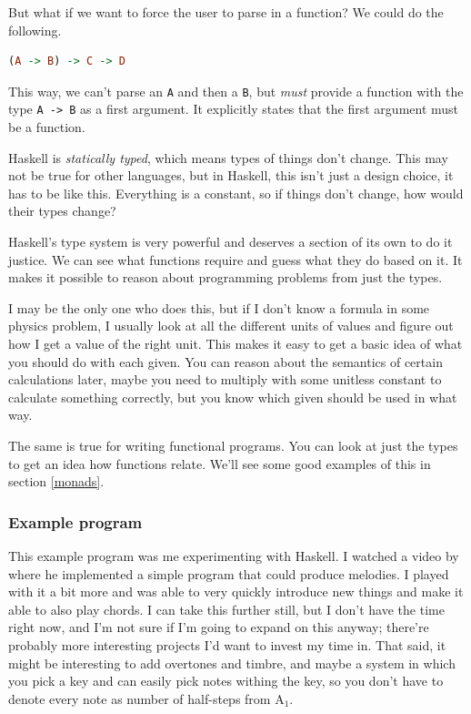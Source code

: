 \documentclass[11pt]{article}
\begin{document}
But what if we want to force the user to parse in a function? We could do the following.
\begin{lstlisting}[language=Haskell]
(A -> B) -> C -> D
\end{lstlisting}
This way, we can't parse an \texttt{A} and then a \texttt{B}, but \emph{must}
provide a function with the type \texttt{A -> B} as a first argument. It
explicitly states that the first argument must be a function.

Haskell is \emph{statically typed}, which means types of things don't change.
This may not be true for other languages, but in Haskell, this isn't just a
design choice, it has to be like this. Everything is a constant, so if things
don't change, how would their types change?

Haskell's type system is very powerful and deserves a section of its own to do
it justice. We can see what functions require and guess what they do based on
it. It makes it possible to reason about programming problems from just the
types.

I may be the only one who does this, but if I don't know a formula in some
physics problem, I usually look at all the different units of values and figure
out how I get a value of the right unit. This makes it easy to get a basic idea
of what you should do with each given. You can reason about the semantics of
certain calculations later, maybe you need to multiply with some unitless
constant to calculate something correctly, but you know which given should be
used in what way.

The same is true for writing functional programs. You can look at just the
types to get an idea how functions relate. We'll see some good examples of this
in section \ref{monads}.

\subsubsection{Example program}

This example program was me experimenting with Haskell. I watched a video by
\textcite{tsmusic} where he implemented a simple program that could produce
melodies. I played with it a bit more and was able to very quickly introduce
new things and make it able to also play chords. I can take this further still,
but I don't have the time right now, and I'm not sure if I'm going to expand on
this anyway; there're probably more interesting projects I'd want to invest my
time in. That said, it might be interesting to add overtones and timbre, and
maybe a system in which you pick a key and can easily pick notes withing the
key, so you don't have to denote every note as number of half-steps from
A\(_1\).
\end{document}
